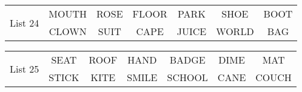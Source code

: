 \documentclass{article}
\begin{document}
\vspace{.1in}
\hspace{.5in}\begin{tabular}{r||c c c c c c }
\multirow{2}{*}{List 24} & MOUTH & ROSE & FLOOR & PARK & SHOE & BOOT\\
\cline{2-7}			& CLOWN & SUIT & CAPE & JUICE & WORLD & BAG\\
\end{tabular}

\vspace{.1in}
\hspace{.5in}\begin{tabular}{r||c c c c c c }
\multirow{2}{*}{List 25} & SEAT & ROOF & HAND & BADGE & DIME & MAT\\
\cline{2-7}			& STICK & KITE & SMILE & SCHOOL & CANE & COUCH\\
\end{tabular}
\end{document}
